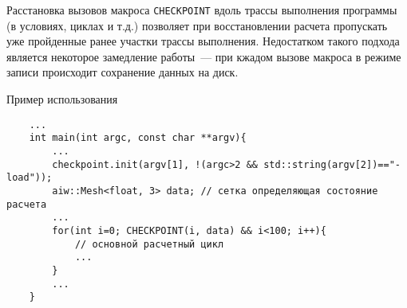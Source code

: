 Расстановка вызовов макроса \verb'CHECKPOINT' вдоль трассы выполнения программы (в условиях, циклах и т.д.) позволяет при восстановлении расчета пропускать
уже пройденные ранее участки трассы выполнения. Недостатком такого подхода является некоторое замедление работы~--- при кжадом вызове макроса в режиме записи происходит
сохранение данных на диск.

Пример использования
\begin{verbatim}
    ...
    int main(int argc, const char **argv){
        ...
        checkpoint.init(argv[1], !(argc>2 && std::string(argv[2])=="-load"));
        aiw::Mesh<float, 3> data; // сетка определяющая состояние расчета 
        ...
        for(int i=0; CHECKPOINT(i, data) && i<100; i++){
            // основной расчетный цикл
            ...
        }
        ...
    }
\end{verbatim}



